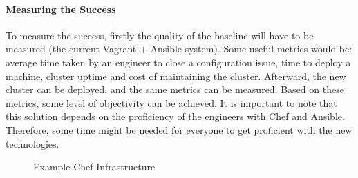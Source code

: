 \paragraph{Measuring the Success}
To measure the success, firstly the quality of the baseline will have to be measured (the current Vagrant + Ansible system). Some useful metrics would be: average time taken by an engineer to close a configuration issue, time to deploy a machine, cluster uptime and cost of maintaining the cluster. Afterward, the new cluster can be deployed, and the same metrics can be measured. Based on these metrics, some level of objectivity can be achieved. It is important to note that this solution depends on the proficiency of the engineers with Chef and Ansible. Therefore, some time might be needed for everyone to get proficient with the new technologies. 

\begin{figure}[h]
    \centering
    \caption{Example Chef Infrastructure}
    \label{fig:chef-infrastructure}
\end{figure}






